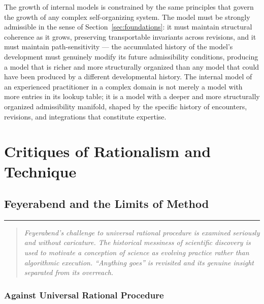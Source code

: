 \documentclass[12pt,openany]{book}
\theoremstyle{plain}
\theoremstyle{definition}
\theoremstyle{remark}
\newcommand{\chapterrule}{%
  \vspace{4pt}%
  {\color{SpherepopBlue}\rule{\textwidth}{0.8pt}}%
  \vspace{10pt}%
}
\newenvironment{chapterprecis}{%
  \begin{quote}\small\itshape}{%
  \end{quote}\medskip}
\begin{document}
The growth of internal models is constrained by the same principles that govern the growth of any complex self-organizing system. The model must be strongly admissible in the sense of Section~\ref{sec:foundations}: it must maintain structural coherence as it grows, preserving transportable invariants across revisions, and it must maintain path-sensitivity — the accumulated history of the model's development must genuinely modify its future admissibility conditions, producing a model that is richer and more structurally organized than any model that could have been produced by a different developmental history. The internal model of an experienced practitioner in a complex domain is not merely a model with more entries in its lookup table; it is a model with a deeper and more structurally organized admissibility manifold, shaped by the specific history of encounters, revisions, and integrations that constitute expertise.

 \clearpage

\part{Critiques of Rationalism and Technique}

\chapter{Feyerabend and the Limits of Method}
\chapterrule

\begin{chapterprecis}
Feyerabend's challenge to universal rational procedure is examined
seriously and without caricature. The historical messiness of
scientific discovery is used to motivate a conception of science
as evolving practice rather than algorithmic execution.
\enquote{Anything goes} is revisited and its genuine insight
separated from its overreach.
\end{chapterprecis}

\section{Against Universal Rational Procedure}
\end{document}
